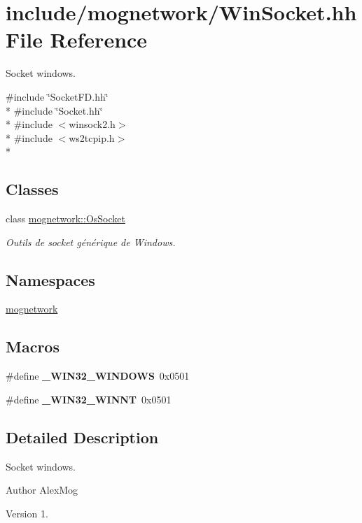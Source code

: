 \hypertarget{_win_socket_8hh}{\section{include/mognetwork/\-Win\-Socket.hh File Reference}
\label{_win_socket_8hh}
}


Socket windows.  


{\ttfamily \#include \char`\"{}Socket\-F\-D.\-hh\char`\"{}}\\*
{\ttfamily \#include \char`\"{}Socket.\-hh\char`\"{}}\\*
{\ttfamily \#include $<$winsock2.\-h$>$}\\*
{\ttfamily \#include $<$ws2tcpip.\-h$>$}\\*
\subsection*{Classes}
\begin{DoxyCompactItemize}
\item 
class \hyperlink{classmognetwork_1_1_os_socket}{mognetwork\-::\-Os\-Socket}
\begin{DoxyCompactList}\small\item\em Outils de socket générique de Windows. \end{DoxyCompactList}\end{DoxyCompactItemize}
\subsection*{Namespaces}
\begin{DoxyCompactItemize}
\item 
\hyperlink{namespacemognetwork}{mognetwork}
\end{DoxyCompactItemize}
\subsection*{Macros}
\begin{DoxyCompactItemize}
\item 
\hypertarget{_win_socket_8hh_a074ca98c073d899c62fc6629918186c8}{\#define {\bfseries \-\_\-\-W\-I\-N32\-\_\-\-W\-I\-N\-D\-O\-W\-S}~0x0501}\label{_win_socket_8hh_a074ca98c073d899c62fc6629918186c8}

\item 
\hypertarget{_win_socket_8hh_ac50762666aa00bd3a4308158510f1748}{\#define {\bfseries \-\_\-\-W\-I\-N32\-\_\-\-W\-I\-N\-N\-T}~0x0501}\label{_win_socket_8hh_ac50762666aa00bd3a4308158510f1748}

\end{DoxyCompactItemize}


\subsection{Detailed Description}
Socket windows. \begin{DoxyAuthor}{Author}
Alex\-Mog 
\end{DoxyAuthor}
\begin{DoxyVersion}{Version}
1. 
\end{DoxyVersion}
